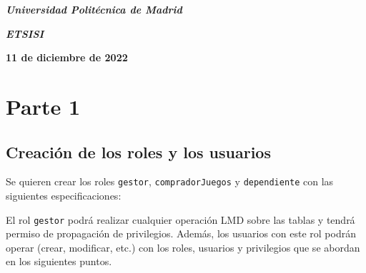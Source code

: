 \documentclass[a4paper, 11pt, oneside]{article} %
\newcommand{\plogo}{\fbox{$\mathcal{LCDPM}$}} %
\begin{document}
\begin{titlepage}
	\vspace{1.0\baselineskip} %
	
	\textit{\textbf{Universidad Politécnica de Madrid \\}} %

	\vspace{0.25\baselineskip} %

	\textit{\textbf{ETSISI}} %
	
	\vfill %
	
	
	\textbf{11 de diciembre de 2022} %
	
	\vspace{0.5\baselineskip} %

	\plogo %

\end{titlepage}


\renewcommand*\contentsname{Índice} %

\setcounter{tocdepth}{3} %

\tableofcontents %

\newpage

	
\section{Parte 1}

\subsection{Creación de los roles y los usuarios}

Se quieren crear los roles \texttt{gestor}, \texttt{compradorJuegos} y \texttt{dependiente} con las siguientes especificaciones:

El rol \texttt{gestor} podrá realizar cualquier operación LMD sobre las tablas y tendrá permiso de propagación de privilegios. Además, los usuarios con este rol podrán operar (crear, modificar, etc.) con los roles, usuarios y privilegios que se abordan en los siguientes puntos.
\end{document}
